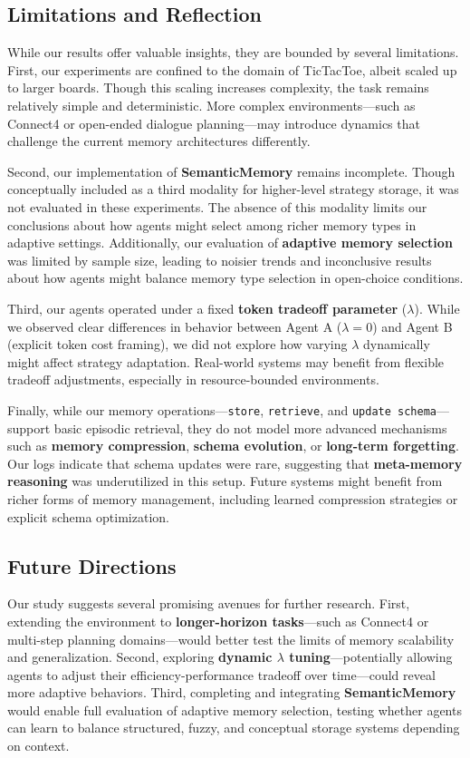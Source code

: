 \documentclass[10pt]{article}
\begin{document}
\subsection{Limitations and Reflection}

While our results offer valuable insights, they are bounded by several limitations. First, our experiments are confined to the domain of TicTacToe, albeit scaled up to larger boards. Though this scaling increases complexity, the task remains relatively simple and deterministic. More complex environments—such as Connect4 or open-ended dialogue planning—may introduce dynamics that challenge the current memory architectures differently.

Second, our implementation of \textbf{SemanticMemory} remains incomplete. Though conceptually included as a third modality for higher-level strategy storage, it was not evaluated in these experiments. The absence of this modality limits our conclusions about how agents might select among richer memory types in adaptive settings. Additionally, our evaluation of \textbf{adaptive memory selection} was limited by sample size, leading to noisier trends and inconclusive results about how agents might balance memory type selection in open-choice conditions.

Third, our agents operated under a fixed \textbf{token tradeoff parameter} ($\lambda$). While we observed clear differences in behavior between Agent A ($\lambda = 0$) and Agent B (explicit token cost framing), we did not explore how varying $\lambda$ dynamically might affect strategy adaptation. Real-world systems may benefit from flexible tradeoff adjustments, especially in resource-bounded environments.

Finally, while our memory operations—\texttt{store}, \texttt{retrieve}, and \texttt{update schema}—support basic episodic retrieval, they do not model more advanced mechanisms such as \textbf{memory compression}, \textbf{schema evolution}, or \textbf{long-term forgetting}. Our logs indicate that schema updates were rare, suggesting that \textbf{meta-memory reasoning} was underutilized in this setup. Future systems might benefit from richer forms of memory management, including learned compression strategies or explicit schema optimization.

\subsection{Future Directions}

Our study suggests several promising avenues for further research. First, extending the environment to \textbf{longer-horizon tasks}—such as Connect4 or multi-step planning domains—would better test the limits of memory scalability and generalization. Second, exploring \textbf{dynamic $\lambda$ tuning}—potentially allowing agents to adjust their efficiency-performance tradeoff over time—could reveal more adaptive behaviors. Third, completing and integrating \textbf{SemanticMemory} would enable full evaluation of adaptive memory selection, testing whether agents can learn to balance structured, fuzzy, and conceptual storage systems depending on context.
\end{document}
